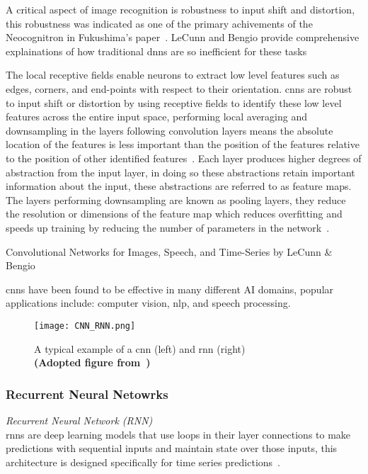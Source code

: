\documentclass[../../D1.tex]{subfiles}
\begin{document}
A critical aspect of image recognition is robustness to input shift and distortion, this robustness was indicated as one of the primary achivements of the Neocognitron in Fukushima's paper~\autocite{fukushimaNeocognitronSelforganizingNeural1980}. LeCunn and Bengio provide comprehensive explainations of how traditional \acrshort{dnn}s are so inefficient for these tasks 


The local receptive fields enable neurons to extract low level features such as edges, corners, and end-points with respect to their orientation. 
\Acrshort{cnn}s are robust to input shift or distortion by using receptive fields to identify these low level features across the entire input space, performing local averaging and downsampling in the layers following convolution layers means the absolute location of the features is less important than the position of the features relative to the position of other identified features~\autocite{lecunConvolutionalNetworksImages}. 
Each layer produces higher degrees of abstraction from the input layer, in doing so these abstractions retain important information about the input, these abstractions are referred to as feature maps.
The layers performing downsampling are known as pooling layers, they reduce the resolution or dimensions of the feature map which reduces overfitting and speeds up training by reducing the number of parameters in the network~\autocite{pouyanfarSurveyDeepLearning2019}.

Convolutional Networks for Images, Speech, and Time-Series by LeCunn \& Bengio


\acrshort{cnn}s have been found to be effective in many different AI domains, popular applications include: computer vision, \Acrshort{nlp}, and speech processing. 

\begin{figure}
    \texttt{[image: CNN\_RNN.png]} 
    \caption{A typical example of a \acrshort*{cnn} (left) and \acrshort{rnn} (right)\\ \textbf{(Adopted figure from~\autocite{chenDeepLearningMobile2020})}}
    \label{fig:exampleCnnRnn}   
\end{figure}

\subsubsection{Recurrent Neural Netowrks}
\emph{Recurrent Neural Network (RNN)\\}
\acrshort{rnn}s are deep learning models that use loops in their layer connections to make predictions with sequential inputs and maintain state over those inputs, this architecture is designed specifically for time series predictions~\autocite{chenDeepLearningEdge2019}.
\end{document}
